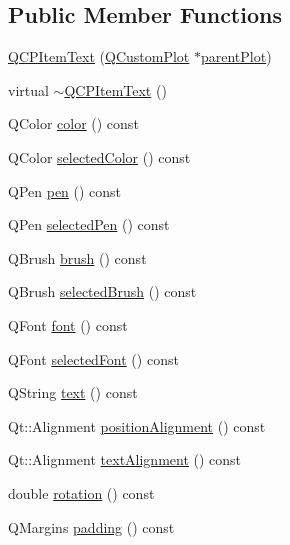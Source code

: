 \subsection*{Public Member Functions}
\begin{DoxyCompactItemize}
\item 
\hyperlink{class_q_c_p_item_text_a77ff96a2972a00872ff8f8c67143abbe}{Q\+C\+P\+Item\+Text} (\hyperlink{class_q_custom_plot}{Q\+Custom\+Plot} $\ast$\hyperlink{class_q_c_p_layerable_ab7e0e94461566093d36ffc0f5312b109}{parent\+Plot})
\item 
virtual \hyperlink{class_q_c_p_item_text_a1efd41ca53d49042d4f4b63cf9615cb6}{$\sim$\+Q\+C\+P\+Item\+Text} ()
\item 
Q\+Color \hyperlink{class_q_c_p_item_text_ac9cb0a8a27f64d1b40855910ea9ebd03}{color} () const 
\item 
Q\+Color \hyperlink{class_q_c_p_item_text_a44f690ec0ba6a32e518f2e923c002e39}{selected\+Color} () const 
\item 
Q\+Pen \hyperlink{class_q_c_p_item_text_a552bd02f46dbcb4b4812559036893352}{pen} () const 
\item 
Q\+Pen \hyperlink{class_q_c_p_item_text_a70c86ec95133d3e904d1718023fe3c4e}{selected\+Pen} () const 
\item 
Q\+Brush \hyperlink{class_q_c_p_item_text_a38b981dfacb703efa8e27346eebcb5a2}{brush} () const 
\item 
Q\+Brush \hyperlink{class_q_c_p_item_text_ac6802bbceff1ade0053166c64a5a6966}{selected\+Brush} () const 
\item 
Q\+Font \hyperlink{class_q_c_p_item_text_ad34943fd68a9b1451d3e3234d072e418}{font} () const 
\item 
Q\+Font \hyperlink{class_q_c_p_item_text_af2e7cacb1975132508714a51c5f48c3b}{selected\+Font} () const 
\item 
Q\+String \hyperlink{class_q_c_p_item_text_a9547f7832010486abed0837e75db5330}{text} () const 
\item 
Qt\+::\+Alignment \hyperlink{class_q_c_p_item_text_af13c6adc480f268116ae72196eb44b06}{position\+Alignment} () const 
\item 
Qt\+::\+Alignment \hyperlink{class_q_c_p_item_text_aaa1d84b3f61f9f2a0cce230e66ef7194}{text\+Alignment} () const 
\item 
double \hyperlink{class_q_c_p_item_text_ae8991207fa1697511c1c8af9f3ca0e0a}{rotation} () const 
\item 
Q\+Margins \hyperlink{class_q_c_p_item_text_a00e0fa03822ff384bf4921c1c90322ff}{padding} () const 

\end{DoxyCompactItemize}
